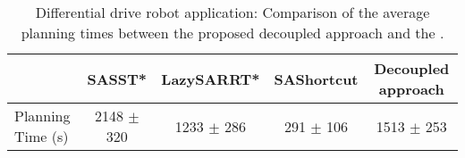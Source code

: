 \begin{table}[h!]
    \begin{tabular}{l|c|c|c|c|}
        \cline{2-5}
                                                & SASST* & LazySARRT* & SAShortcut & Decoupled approach \\ \hline
        \multicolumn{1}{|l|}{Planning Time (s)} &   2148 $\pm$ 320    &    1233 $\pm$ 286       &    291 $\pm$ 106         &        1513 $\pm$ 253           \\ \hline
    \end{tabular}
    \caption{
        \label{tab:lazySAMP_unic}
        Differential drive robot application: Comparison of the average planning times between the proposed decoupled approach and the .
    }
\end{table}